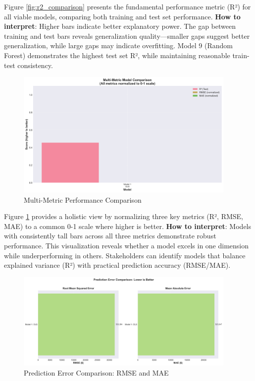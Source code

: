 Figure \ref{fig:r2_comparison} presents the fundamental performance metric (R²) for all viable models, comparing both training and test set performance. \textbf{How to interpret}: Higher bars indicate better explanatory power. The gap between training and test bars reveals generalization quality—smaller gaps suggest better generalization, while large gaps may indicate overfitting. Model 9 (Random Forest) demonstrates the highest test set R², while maintaining reasonable train-test consistency.

\begin{figure}[h!]
\centering
\includegraphics[width=0.95\textwidth]{figures/plot_b_multi_metric.png}
\caption{Multi-Metric Performance Comparison}
\label{fig:multi_metric}
\end{figure}

Figure \ref{fig:multi_metric} provides a holistic view by normalizing three key metrics (R², RMSE, MAE) to a common 0-1 scale where higher is better. \textbf{How to interpret}: Models with consistently tall bars across all three metrics demonstrate robust performance. This visualization reveals whether a model excels in one dimension while underperforming in others. Stakeholders can identify models that balance explained variance (R²) with practical prediction accuracy (RMSE/MAE).

\begin{figure}[h!]
\centering
\includegraphics[width=0.95\textwidth]{figures/plot_c_error_metrics.png}
\caption{Prediction Error Comparison: RMSE and MAE}
\label{fig:error_metrics}
\end{figure}

